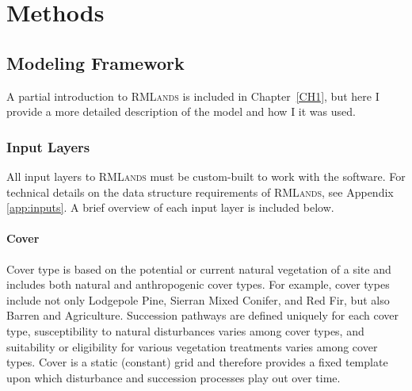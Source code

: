 
\section{Methods}
\label{sec:hrvmethods}


\subsection{Modeling Framework}
\label{sec:modelframe}

A partial introduction to \textsc{RMLands} is included in Chapter~\ref{CH1}, but here I provide a more detailed description of the model and how I it was used.

\subsubsection{Input Layers}
\label{subsec:hrvinputlayers}

All input layers to \textsc{RMLands} must be custom-built to work with the software. For technical details on the data structure requirements of \textsc{RMLands}, see Appendix \ref{app:inputs}. A brief overview of each input layer is included below.

\paragraph{Cover} Cover type is based on the potential or current natural vegetation of a site and includes both natural and anthropogenic cover types. For example, cover types include not only Lodgepole Pine, Sierran Mixed Conifer, and Red Fir, but also Barren and Agriculture. Succession pathways are defined uniquely for each cover type, susceptibility to natural disturbances varies among cover types, and suitability or eligibility for various vegetation treatments varies among cover types. Cover is a static (constant) grid and therefore provides a fixed template upon which disturbance and succession processes play out over time. 


